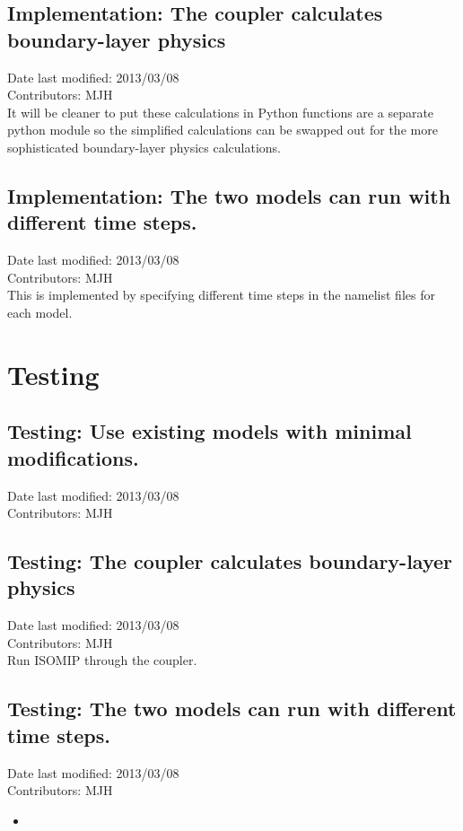 \documentclass[11pt]{report}
\begin{document}
\section{Implementation: The coupler calculates boundary-layer physics}
Date last modified: 2013/03/08 \\
Contributors: MJH \\

It will be cleaner to put these calculations in Python functions are a separate python module so the simplified calculations can be swapped out for the more sophisticated boundary-layer physics calculations.

\section{Implementation: The two models can run with different time steps.}
Date last modified: 2013/03/08 \\
Contributors: MJH \\

This is implemented by specifying different time steps in the namelist files for each model.



\chapter{Testing}

\section{Testing: Use existing models with minimal modifications.}
Date last modified: 2013/03/08 \\
Contributors: MJH \\

\section{Testing: The coupler calculates boundary-layer physics}
Date last modified: 2013/03/08 \\
Contributors: MJH \\

Run ISOMIP through the coupler.

\section{Testing: The two models can run with different time steps.}
Date last modified: 2013/03/08 \\
Contributors: MJH \\


\begin{itemize}
\item 
\end{itemize}
\end{document}
